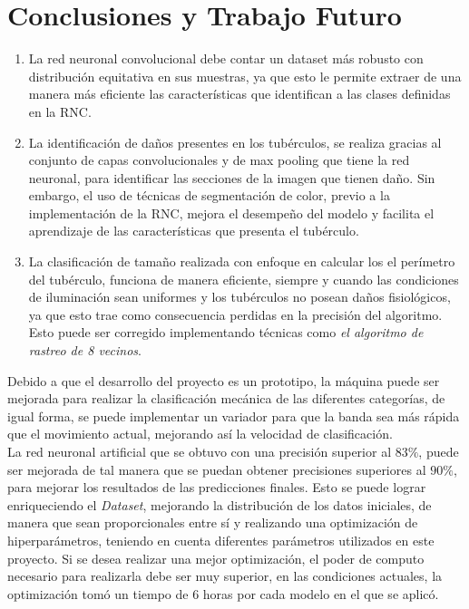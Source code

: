 \chapter{Conclusiones y Trabajo Futuro}

\begin{enumerate}
	\item La red neuronal convolucional debe contar un dataset más robusto con distribución equitativa en sus muestras, ya que esto le permite extraer de una manera más eficiente las características que identifican a las clases definidas en la RNC.
	
	\item La identificación de daños presentes en los tubérculos, se realiza gracias al conjunto de capas convolucionales y de max pooling que tiene la red neuronal, para identificar las secciones de la imagen que tienen daño. Sin embargo, el uso de técnicas de segmentación de color, previo a la implementación de la RNC, mejora el desempeño del modelo y facilita el aprendizaje de las características que presenta el tubérculo.
	
	\item La clasificación de tamaño realizada con enfoque en calcular los el perímetro del tubérculo, funciona de manera eficiente, siempre y cuando las condiciones de iluminación sean uniformes y los tubérculos no posean daños fisiológicos, ya que esto trae como consecuencia perdidas en la precisión del algoritmo. Esto puede ser corregido implementando técnicas como \textit{el algoritmo de rastreo de 8 vecinos}.

\end{enumerate}


Debido a que el desarrollo del proyecto es un prototipo, la máquina puede ser mejorada para realizar la clasificación mecánica de las diferentes categorías, de igual forma, se puede implementar un variador para que la banda sea más rápida que el movimiento actual, mejorando así la velocidad de clasificación.\\

La red neuronal artificial que se obtuvo con una precisión superior al $83\%$, puede ser mejorada de tal manera que se puedan obtener precisiones superiores al $90\%$, para mejorar los resultados de las predicciones finales. Esto se puede lograr enriqueciendo el \textit{Dataset}, mejorando la distribución de los datos iniciales, de manera que sean proporcionales entre sí y realizando una optimización de hiperparámetros, teniendo en cuenta diferentes parámetros utilizados en este proyecto. Si se desea realizar una mejor optimización, el poder de computo necesario para realizarla debe ser muy superior, en las condiciones actuales, la optimización tomó un tiempo de $6$ horas por cada modelo en el que se aplicó.\\

